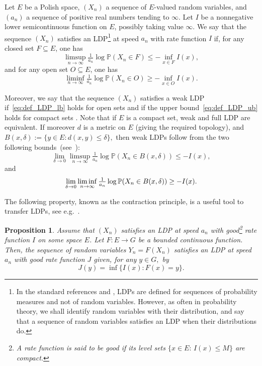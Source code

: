 \documentclass[a4paper,11pt]{amsart}
\newtheorem{prop}[thm]{Proposition}
\theoremstyle{definition}
\begin{document}
Let $E$ be a Polish space, $(X_n)$ a sequence of $E$-valued random variables, and $(a_n)$ a sequence of positive real numbers tending to $\infty$.
Let $I$ be a nonnegative lower semicontinuous function on $E$, possibly taking value $\infty$.
We say that the sequence $(X_n)$ satisfies an LDP\footnote{In the standard references \cite{dembo1998large-deviations} and \cite{anderson2010BookRandomMatrix}, LDPs are defined for sequences of probability measures and not of random variables. 
However, as often in probability theory, we shall identify random variables with their distribution, and say that a sequence of random variables satisfies an LDP when their distributions do.} 
at speed $a_n$ with rate function $I$ if, for any closed set $F \subseteq E$, one has
\begin{equation}\label{eq:def_LDP_ub}
  \limsup_{n \to \infty} \tfrac1{a_n} \log\mathbb{P}(X_n \in F) \le -\inf_{x \in F} I(x),
\end{equation}
and for any open set $O \subseteq E$, one has
\begin{equation}\label{eq:def_LDP_lb}
   \liminf_{n \to \infty} \tfrac1{a_n} \log\mathbb{P}(X_n \in O) \ge -\inf_{x \in O} I(x).
\end{equation}

Moreover, we say that the sequence $(X_n)$ satisfies a weak LDP if~\eqref{eq:def_LDP_lb} holds for open sets and if the upper bound~\eqref{eq:def_LDP_ub} holds for compact sets \cite[Definition D.2]{anderson2010BookRandomMatrix}.
Note that if $E$ is a compact set, weak and full LDP are equivalent. If moreover $d$ is a metric on $E$ (giving the required topology), and $B(x,\delta) := \{ y\in E : d(x,y) \le \delta\},$ then weak LDPs follow from the two following bounds~(see~\cite[Corollary D.6]{anderson2010BookRandomMatrix}):
\[ \lim_{\delta \rightarrow 0} \limsup_{n \rightarrow \infty} \tfrac1{a_n} \log\mathbb{P}(X_n \in B(x,\delta)) \le - I(x),  \]
and
\[ \lim_{\delta \rightarrow 0} \liminf_{n \rightarrow \infty} \tfrac1{a_n} \log\mathbb{P}(X_n \in B(x,\delta)) \ge - I(x).\medskip  \]

The following property, known as the contraction principle, is a useful tool to transfer LDPs, see e.g.~\cite[Theorem 4.2.1]{dembo1998large-deviations}.
\begin{prop}
 \label{prop:contractionprinciple}
 Assume that $(X_n)$ satisfies an LDP at speed $a_n$ with good\footnote{A rate function is said to be \textit{good} if its level sets $\{x \in E: \, I(x) \le M\}$ are compact.} rate function $I$ on some space $E$.   
 Let $F:E \rightarrow G$ be a bounded continuous function. 
 Then, the sequence of random variables $Y_n=F(X_n)$ satisfies an LDP at speed $a_n$ with good rate function $J$ given, for any $y\in G,$ by
 \[ J(y) =  \inf\{ I(x) : F(x)=y\}.\]
\end{prop}
\end{document}
